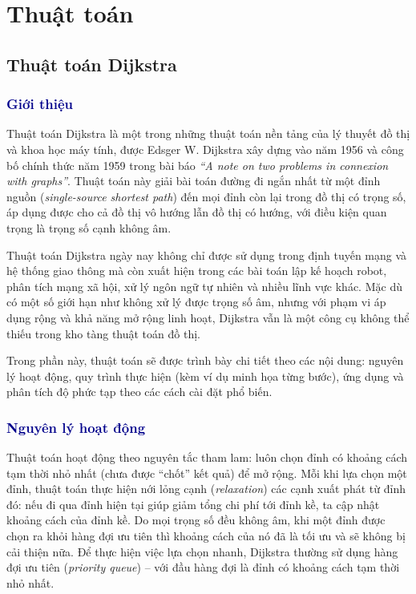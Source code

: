 \documentclass[14pt,a4paper]{report}
\begin{document}
\section{Thuật toán}


\subsection{Thuật toán Dijkstra}



\subsubsection{\textcolor{darkblue}{Giới thiệu}}
Thuật toán Dijkstra là một trong những thuật toán nền tảng của lý thuyết đồ thị và khoa học máy tính, được Edsger W. Dijkstra xây dựng vào năm 1956 và công bố chính thức năm 1959 trong bài báo \textit{``A note on two problems in connexion with graphs''}. Thuật toán này giải bài toán đường đi ngắn nhất từ một đỉnh nguồn (\textit{single-source shortest path}) đến mọi đỉnh còn lại trong đồ thị có trọng số, áp dụng được cho cả đồ thị vô hướng lẫn đồ thị có hướng, với điều kiện quan trọng là trọng số cạnh không âm.
\vspace{2.5pt}

Thuật toán Dijkstra ngày nay không chỉ được sử dụng trong định tuyến mạng 
và hệ thống giao thông mà còn xuất hiện trong các bài toán lập kế hoạch robot, phân 
tích mạng xã hội, xử lý ngôn ngữ tự nhiên và nhiều lĩnh vực khác. Mặc dù có một số 
giới hạn như không xử lý được trọng số âm, nhưng với phạm vi áp dụng rộng và khả 
năng mở rộng linh hoạt, Dijkstra vẫn là một công cụ không thể thiếu trong kho tàng 
thuật toán đồ thị.
\vspace{2.5pt}

Trong phần này, thuật toán sẽ được trình bày chi tiết theo các nội dung: nguyên lý hoạt động, quy trình thực hiện (kèm ví dụ minh họa từng bước), ứng dụng và phân tích độ phức tạp theo các cách cài đặt phổ biến.


\subsubsection{\textcolor{darkblue}{Nguyên lý hoạt động}}
Thuật toán hoạt động theo nguyên tắc tham lam: luôn chọn đỉnh có khoảng cách tạm thời nhỏ nhất (chưa được ``chốt'' kết quả) để mở rộng. Mỗi khi lựa chọn một đỉnh, thuật toán thực hiện nới lỏng cạnh (\textit{relaxation}) các cạnh xuất phát từ đỉnh đó: nếu đi qua đỉnh hiện tại giúp giảm tổng chi phí tới đỉnh kề, ta cập nhật khoảng cách của đỉnh kề. Do mọi trọng số đều không âm, khi một đỉnh được chọn ra khỏi hàng đợi ưu tiên thì khoảng cách của nó đã là tối ưu và sẽ không bị cải thiện nữa. Để thực hiện việc lựa chọn nhanh, Dijkstra thường sử dụng hàng đợi ưu tiên (\textit{priority queue}) -- với đầu hàng đợi là đỉnh có khoảng cách tạm thời nhỏ nhất.
\end{document}
